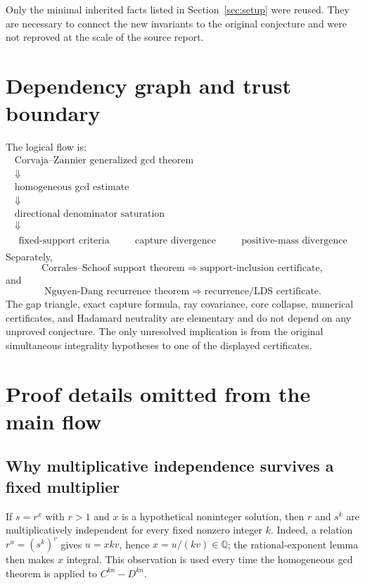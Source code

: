 \documentclass[11pt,oneside]{article}
\theoremstyle{definition}
\theoremstyle{remark}
\newcommand{\Q}{\mathbb Q}
\begin{document}
Only the minimal inherited facts listed in Section~\ref{sec:setup} were reused.  They are
necessary to connect the new invariants to the original conjecture and were not reproved at
the scale of the source report.

\section{Dependency graph and trust boundary}
\label{app:dependencies}

The logical flow is:
\[
\begin{array}{c}
\text{Corvaja--Zannier generalized gcd theorem}
\\[0.3em]\Downarrow\\[-0.2em]
\text{homogeneous gcd estimate}
\\[0.3em]\Downarrow\\[-0.2em]
\text{directional denominator saturation}
\\[0.3em]\Downarrow\\[-0.2em]
\begin{matrix}
\text{fixed-support criteria}&\quad&
\text{capture divergence}&\quad&
\text{positive-mass divergence}
\end{matrix}
\end{array}
\]
Separately,
\[
\text{Corrales--Schoof support theorem}
\Longrightarrow
\text{support-inclusion certificate},
\]
and
\[
\text{Nguyen-Dang recurrence theorem}
\Longrightarrow
\text{recurrence/LDS certificate}.
\]
The gap triangle, exact capture formula, ray covariance, core collapse, numerical
certificates, and Hadamard neutrality are elementary and do not depend on any unproved
conjecture.  The only unresolved implication is from the original simultaneous integrality
hypotheses to one of the displayed certificates.

\section{Proof details omitted from the main flow}
\label{app:proof-details}

\subsection{Why multiplicative independence survives a fixed multiplier}

If $s=r^x$ with $r>1$ and $x$ is a hypothetical noninteger solution, then $r$ and $s^k$ are
multiplicatively independent for every fixed nonzero integer $k$.  Indeed, a relation
$r^u=(s^k)^v$ gives $u=xkv$, hence $x=u/(kv)\in\Q$; the rational-exponent lemma then makes
$x$ integral.  This observation is used every time the homogeneous gcd theorem is applied to
$C^{kn}-D^{kn}$.
\end{document}
